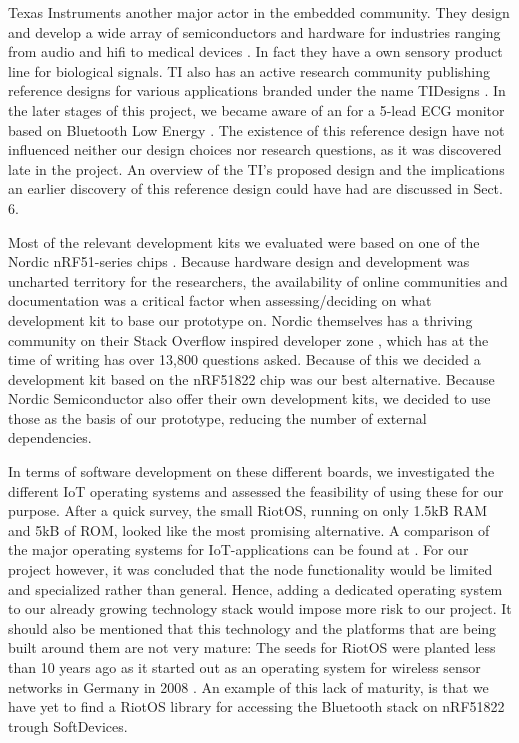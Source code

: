 Texas Instruments another major actor in the embedded community. They design and develop a wide array of semiconductors and hardware for industries ranging from audio and hifi to medical devices \cite{newRef_46}. In fact they have a own sensory product line for biological signals. TI also has an active research community publishing reference designs for various applications branded under the name TIDesigns \cite{newRef_47}. In the later stages of this project, we became aware of an for a 5-lead ECG monitor based on Bluetooth Low Energy \cite{Anonymous:Q0qkTQkl}. The existence of this reference design have not influenced neither our design choices nor research questions, as it was discovered late in the project. An overview of the TI's proposed design and the implications an earlier discovery of this reference design could have had are discussed in Sect. 6.

Most of the relevant development kits we evaluated were based on one of the Nordic nRF51-series chips \cite{newRef_36, newRef_36_2}. Because hardware design and development was uncharted territory for the researchers, the availability of online communities and documentation was a critical factor when assessing/deciding on what development kit to base our prototype on. Nordic themselves has a thriving community on their Stack Overflow inspired developer zone \cite{newRef_50}, which has at the time of writing has over 13,800 questions asked. Because of this we decided a development kit based on the  nRF51822 chip was our best alternative. Because Nordic Semiconductor also offer their own development kits, we decided to use those as the basis of our prototype, reducing the number of external dependencies. 

In terms of software development on these different boards, we investigated the different IoT operating systems and assessed the feasibility of using these for our purpose. After a quick survey, the small RiotOS, running on only 1.5kB RAM and 5kB of ROM, looked like the most promising alternative. A comparison of the major operating systems for IoT-applications can be found at \cite{Anonymous:a1din1ZK}. For our project however, it was concluded that the node functionality would be limited and specialized rather than general. Hence, adding a dedicated operating system to our already growing technology stack would impose more risk to our project. It should also be mentioned that this technology and the platforms that are being built around them are not very mature: The seeds for RiotOS were planted less than 10 years ago as it started out as an operating system for wireless sensor networks in Germany in 2008 \cite{newRef_52}. An example of this lack of maturity, is that we have yet to find a RiotOS library for accessing the Bluetooth stack on nRF51822 trough SoftDevices.

